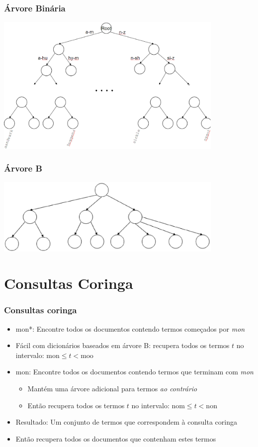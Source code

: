 \documentclass[compress]{beamer}
\def\query#1{{\sf #1}}
\begin{document}
\begin{frame}
\frametitle{Árvore Binária}
\includegraphics[width=11cm]{bst.eps}
\end{frame}

\begin{frame}
\frametitle{Árvore B}
\includegraphics[width=11cm]{btree.eps}
\end{frame}
 
 \section{Consultas Coringa}

\begin{frame}
\frametitle{Consultas coringa}
\begin{itemize}[<+->]
\item \query{mon*}: Encontre todos os documentos contendo termos começados 
por \emph{mon}
\item Fácil com dicionários baseados em árvore B: recupera todos os termos $t$ 
no intervalo: $ \mbox{mon} \leq t < 
\mbox{moo}$
\item \query{*mon}: Encontre todos os documentos contendo termos que terminam 
com \emph{mon}
\begin{itemize}[<+->]
\item Mantém uma árvore adicional para termos  \emph{ao contrário}
\item Então recupera todos os termos $t$ no intervalo: $
  \mbox{nom} \leq t < 
\mbox{non}$
\end{itemize}
\item Resultado: Um conjunto de termos que correspondem à consulta 
coringa
\item Então recupera todos os documentos que contenham estes termos
\end{itemize}
\end{frame}
\end{document}
